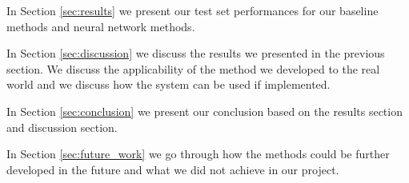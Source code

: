 In Section \ref{sec:results} we present our test set performances for our
baseline methods and neural network methods.

In Section \ref{sec:discussion} we discuss the results we presented in the
previous section. We discuss the applicability of the method we developed to the
real world and we discuss how the system can be used if implemented.

In Section \ref{sec:conclusion} we present our conclusion based on the results
section and discussion section.

In Section \ref{sec:future_work} we go through how the methods could be further
developed in the future and what we did not achieve in our project.
